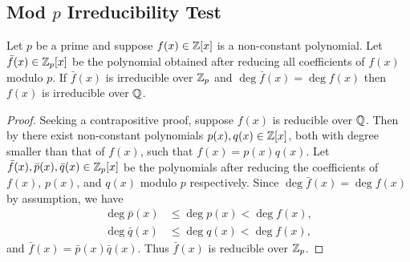 \subsection{Mod $p$ Irreducibility Test}
\begin{theorem}\label{thrm-mod-p-irreducibility-test}
    Let $p$ be a prime and suppose $f(x) \in \mathbb{Z}[x]$ is a non-constant polynomial. Let $\bar{f}(x) \in \mathbb{Z}_p[x]$ be the polynomial obtained after reducing all coefficients of $f(x)$ modulo $p$. If $\bar{f}(x)$ is irreducible over $\mathbb{Z}_p$ and $\deg \bar{f}(x) = \deg f(x)$ then $f(x)$ is irreducible over $\mathbb{Q}$.
\end{theorem}
\begin{proof}
    Seeking a contrapositive proof, suppose $f(x)$ is reducible over $\mathbb{Q}$. Then by  there exist non-constant polynomials $p(x), q(x) \in \mathbb{Z}[x]$, both with degree smaller than that of $f(x)$, such that $f(x) = p(x)q(x)$. Let $\bar{f}(x), \bar{p}(x), \bar{q}(x) \in \mathbb{Z}_p[x]$ be the polynomials after reducing the coefficients of $f(x)$, $p(x)$, and $q(x)$ modulo $p$ respectively. Since $\deg \bar{f}(x) = \deg f(x)$ by assumption, we have
    \begin{align*}
        \deg \bar{p}(x) &\leq \deg p(x) < \deg f(x),\\
        \deg \bar{q}(x) &\leq \deg q(x) < \deg f(x),
    \end{align*}
    and $\bar{f}(x) = \bar{p}(x)\bar{q}(x)$. Thus $\bar{f}(x)$ is reducible over $\mathbb{Z}_p$.
\end{proof}

